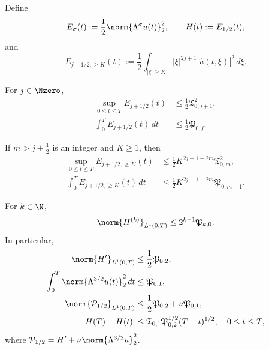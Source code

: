 \begin{proposition}
\label{u:prop:qc-critical-height}
Define
\[
 E_\sigma(t):=\frac12\norm{\Lambda^\sigma u(t)}_2^2,
 \qquad
 H(t):=E_{1/2}(t),
\]
and
\[
 E_{j+1/2,\ge K}(t)
 :=\frac12\int_{|\xi|\ge K}|\xi|^{2j+1}
 |\widehat u(t,\xi)|^2\,d\xi.
\]
\begin{samepage}
For \(j\in\Nzero\),
\begin{align}
 \sup_{0\le t\le T}E_{j+1/2}(t)
 &\le\frac12\mathfrak T_{0,j+1}^2,
 \label{u:eq:qc-critical-sup}\\
 \int_0^T E_{j+1/2}(t)\,dt
 &\le\frac12\mathfrak P_{0,j}.
 \label{u:eq:qc-critical-mass}
\end{align}
\end{samepage}
If \(m>j+\frac12\) is an integer and \(K\ge1\), then
\begin{align}
 \sup_{0\le t\le T}E_{j+1/2,\ge K}(t)
 &\le\frac12K^{2j+1-2m}\mathfrak T_{0,m}^2,
 \label{u:eq:qc-critical-tail-sup}\\
 \int_0^T E_{j+1/2,\ge K}(t)\,dt
 &\le\frac12K^{2j+1-2m}\mathfrak P_{0,m-1}.
 \label{u:eq:qc-critical-tail-mass}
\end{align}
\begin{samepage}
For \(k\in\N\),
\begin{equation}
 \norm{H^{(k)}}_{L^1(0,T)}
 \le2^{k-1}\mathfrak P_{k,0}.
 \label{u:eq:qc-height-derivatives}
\end{equation}
In particular,
\begin{align}
 \norm{H'}_{L^1(0,T)}
 &\le\frac12\mathfrak P_{0,2},
 \label{u:eq:qc-critical-variation}\\
 \int_0^T\norm{\Lambda^{3/2}u(t)}_2^2\,dt
 &\le\mathfrak P_{0,1},
 \label{u:eq:qc-critical-dissipation}\\
 \norm{\mathcal P_{1/2}}_{L^1(0,T)}
 &\le\frac12\mathfrak P_{0,2}+\nu\mathfrak P_{0,1},
 \label{u:eq:qc-critical-current}\\
 |H(T)-H(t)|
 &\le
 \mathfrak T_{0,1}\mathfrak P_{0,2}^{1/2}(T-t)^{1/2},
 \quad0\le t\le T,
 \label{u:eq:qc-critical-endpoint-modulus}
\end{align}
where
\(\mathcal P_{1/2}=H'+\nu\norm{\Lambda^{3/2}u}_2^2\).
\end{samepage}
\end{proposition}


